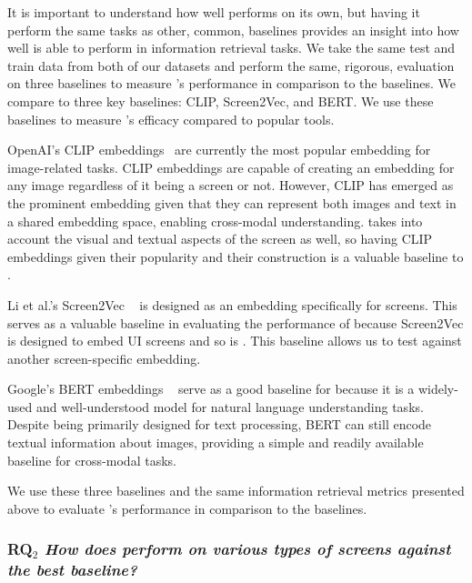 It is important to understand how well \FRAME performs on its own, but having it perform the same tasks as other, common, baselines provides an insight into how well \FRAME is able to perform in information retrieval tasks. We take the same test and train data from both of our datasets and perform the same, rigorous, evaluation on three baselines to measure \FRAME's performance in comparison to the baselines. We compare \FRAME to three key baselines: CLIP, Screen2Vec, and BERT. We use these baselines to measure \FRAME 's efficacy compared to popular tools. 


OpenAI's CLIP embeddings~\cite{clip} are currently the most popular embedding for image-related tasks. CLIP embeddings are capable of creating an embedding for any image regardless of it being a screen or not. However, CLIP has emerged as the prominent embedding given that they can represent both images and text in a shared embedding space, enabling cross-modal understanding. \FRAME takes into account the visual and textual aspects of the screen as well, so having CLIP embeddings given their popularity and their construction is a valuable baseline to \FRAME. 



Li et al.'s Screen2Vec ~\cite{Li21} is designed as an embedding specifically for screens. This serves as a valuable baseline in evaluating the performance of \FRAME because Screen2Vec is designed to embed UI screens and so is \FRAME. This baseline allows us to test \FRAME against another screen-specific embedding.  


Google's BERT embeddings ~\cite{BERT} serve as a good baseline for \FRAME because it is a widely-used and well-understood model for natural language understanding tasks. Despite being primarily designed for text processing, BERT can still encode textual information about images, providing a simple and readily available baseline for cross-modal tasks. 

We use these three baselines and the same information retrieval metrics presented above to evaluate \FRAME 's performance in comparison to the baselines. 

\subsubsection{\textbf{RQ$_2$} \textit{How does \FRAME perform on various types of screens against the best baseline?}}

